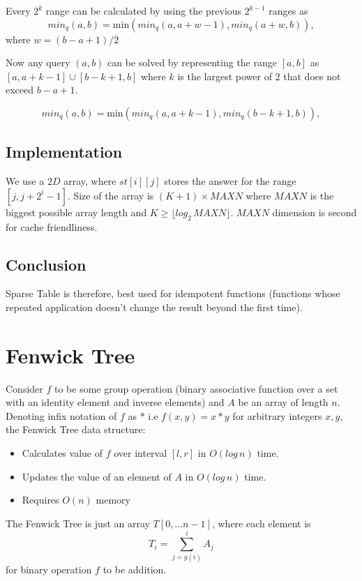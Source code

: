 \documentclass{article}
\begin{document}
	Every $2^k$ range can be calculated by using the previous $2^{k-1}$ ranges as 
	\[
	min_q(a,b) = \text{min}(min_q(a,a+w-1), min_q(a+w,b)),
	\]
	where $w = (b-a+1)/2$ \newline
	
	Now any query $(a,b)$ can be solved by representing the range $[a,b]$ as \newline $[a,a+k-1] \cup [b-k+1,b]$ where $k$ is the largest power of $2$ that does not exceed $b-a+1$.
	
	\[
	min_q(a,b) = \text{min}(min_q(a,a+k-1),min_q(b-k+1,b)),
	\]
	
	\subsection{Implementation}
	We use a $2D$ array, where $st[i][j]$ stores the answer for the range $[j,j+2^i - 1]$. Size of the array is $(K+1) \times MAXN$ where $MAXN$ is the biggest possible array length and $K \geq \lfloor log_2 \, MAXN \rfloor$. $MAXN$ dimension is second for cache friendliness.
	
	\subsection{Conclusion}
	Sparse Table is therefore, best used for idempotent functions (functions whose repeated application doesn't change the result beyond the first time).
	
	\section{Fenwick Tree}
	Consider $f$ to be some group operation (binary associative function over a set with an identity element and inverse elements) and $A$ be an array of length $n$. Denoting infix notation of $f$ as $*$ i.e $f(x,y) = x*y$ for arbitrary integers $x,y$, the Fenwick Tree data structure:
	\begin{itemize}
		\item Calculates value of $f$ over interval $[l,r]$ in $O(log \, n)$ time.
		\item Updates the value of an element of $A$ in $O(log \, n)$ time.
		\item Requires $O(n)$ memory
	\end{itemize}
	\vspace{1mm}
	The Fenwick Tree is just an array $T[0, \ldots n-1]$, where each element is 
	\[
	T_i = \sum^i_{j=g(i)}	A_j
	\]
	for binary operation $f$ to be addition.
	
\end{document}

